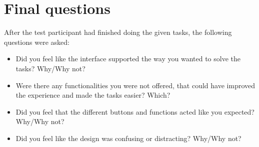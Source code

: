 \section*{Final questions}
After the test participant had finished doing the given tasks, the following questions were asked:

\begin{itemize}
    \item Did you feel like the interface supported the way you wanted to solve the tasks? Why/Why not?
    \item Were there any functionalities you were not offered, that could have improved the experience and made the tasks easier? Which?
    \item Did you feel that the different buttons and functions acted like you expected? Why/Why not?
    \item Did you feel like the design was confusing or distracting? Why/Why not?
\end{itemize}